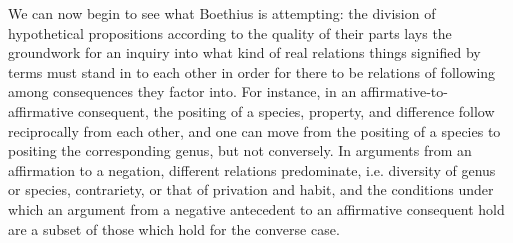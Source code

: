 \documentclass[a4paper, 11pt]{article}
\begin{document}
We can now begin to see what Boethius is attempting: the division of hypothetical propositions according to the quality of their parts lays the groundwork for an inquiry into what kind of real relations things signified by terms must stand in to each other in order for there to be relations of following among consequences they factor into. For instance, in an affirmative-to-affirmative consequent, the positing of a species, property, and difference follow reciprocally from each other, and one can move from the positing of a species to positing the corresponding genus, but not conversely. In arguments from an affirmation to a negation, different relations predominate, i.e.  diversity of genus or species, contrariety, or that of privation and habit, and the conditions under which an argument from a negative antecedent to an affirmative consequent hold are a subset of those which hold for the converse case.
\end{document}
